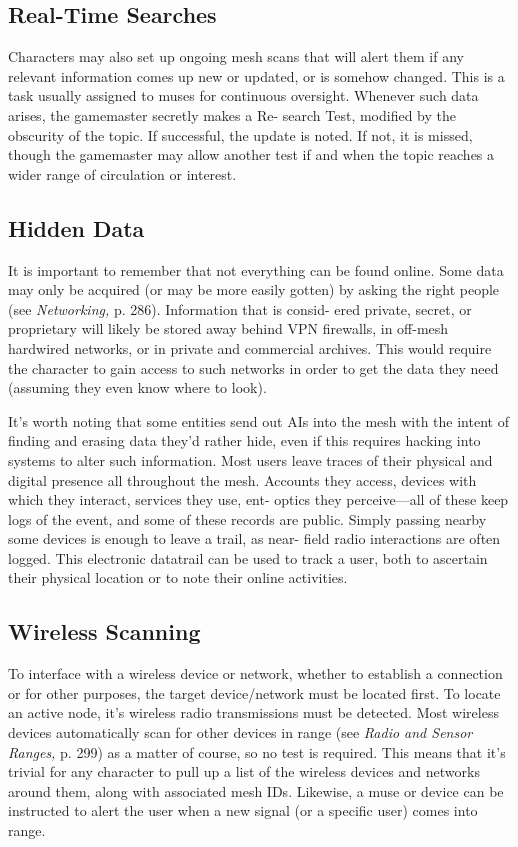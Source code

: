 \subsection{Real-Time Searches}

Characters may also set up ongoing mesh scans that will 
alert them if any relevant information comes up new or 
updated, or is somehow changed. This is a task usually 
assigned to muses for continuous oversight. Whenever 
such data arises, the gamemaster secretly makes a Re-
search Test, modified by the obscurity of the topic. If 
successful, the update is noted. If not, it is missed, though 
the gamemaster may allow another test if and when the 
topic reaches a wider range of circulation or interest.

\subsection{Hidden Data}

It is important to remember that not everything can 
be found online. Some data may only be acquired (or 
may be more easily gotten) by asking the right people 
(see \textit{Networking,} p. 286). Information that is consid-
ered private, secret, or proprietary will likely be stored 
away behind VPN firewalls, in off-mesh hardwired 
networks, or in private and commercial archives. This 
would require the character to gain access to such 
networks in order to get the data they need (assuming 
they even know where to look).

It's worth noting that some entities send out AIs 
into the mesh with the intent of finding and erasing 
data they'd rather hide, even if this requires hacking 
into systems to alter such information.
Most users leave traces of their physical and digital 
presence all throughout the mesh. Accounts they access, 
devices with which they interact, services they use, ent-
optics they perceive—all of these keep logs of the event, 
and some of these records are public. Simply passing 
nearby some devices is enough to leave a trail, as near-
field radio interactions are often logged. This electronic 
datatrail can be used to track a user, both to ascertain 
their physical location or to note their online activities.

\subsection{Wireless Scanning}

To interface with a wireless device or network, whether 
to establish a connection or for other purposes, the 
target device/network must be located first. To locate 
an active node, it's wireless radio transmissions must be 
detected. Most wireless devices automatically scan for 
other devices in range (see \textit{Radio and Sensor Ranges,} p. 
299) as a matter of course, so no test is required. This 
means that it's trivial for any character to pull up a 
list of the wireless devices and networks around them, 
along with associated mesh IDs. Likewise, a muse or 
device can be instructed to alert the user when a new 
signal (or a specific user) comes into range.

